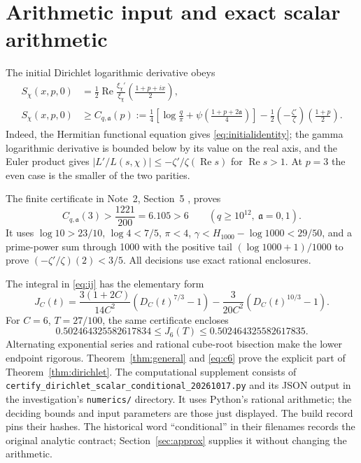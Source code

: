 \documentclass[11pt]{article}
\theoremstyle{remark}\newtheorem{remark}[theorem]{Remark}
\newcommand{\Rea}{\operatorname{Re}}
\begin{document}
\section{Arithmetic input and exact scalar arithmetic}
The initial Dirichlet logarithmic derivative obeys
\begin{align}
 S_\chi(x,p,0)&=\frac12\Rea\frac{\xi_\chi'}{\xi_\chi}
                    \left(\frac{1+p+ix}{2}\right),\label{eq:initialidentity}\\
 S_\chi(x,p,0)&\ge C_{q,\mathfrak a}(p):=
 \frac14\left[\log\frac q\pi+
 \psi\left(\frac{1+p+2\mathfrak a}{4}\right)\right]
 -\frac12\left(-\frac{\zeta'}\zeta\right)\left(\frac{1+p}{2}\right).
 \label{eq:c}
\end{align}
Indeed, the Hermitian functional equation gives
\eqref{eq:initialidentity}; the gamma logarithmic derivative is bounded
below by its value on the real axis, and the Euler product gives
$|L'/L(s,\chi)|\le-\zeta'/\zeta(\Rea s)$ for $\Rea s>1$.
At $p=3$ the even case is the smaller of the two parities.

The finite certificate in Note~2, Section~5 \cite{note2}, proves
\begin{equation}
 C_{q,\mathfrak a}(3)>\frac{1221}{200}=6.105>6
 \qquad(q\ge10^{12},\ \mathfrak a=0,1).\label{eq:c6}
\end{equation}
It uses $\log10>23/10$, $\log4<7/5$, $\pi<4$,
$\gamma<H_{1000}-\log1000<29/50$, and a prime-power sum through 1000
with the positive tail $(\log1000+1)/1000$ to prove
$(-\zeta'/\zeta)(2)<3/5$. All decisions use exact rational enclosures.

The integral in \eqref{eq:ij} has the elementary form
\begin{equation}
 J_C(t)=\frac{3(1+2C)}{14C^2}(D_C(t)^{7/3}-1)
       -\frac3{20C^2}(D_C(t)^{10/3}-1).\label{eq:exactj}
\end{equation}
For $C=6$, $T=27/100$, the same certificate encloses
\[0.502464325582617834\le J_6(T)\le0.502464325582617835.\]
Alternating exponential series and rational cube-root bisection make
the lower endpoint rigorous. Theorem~\ref{thm:general} and
\eqref{eq:c6} prove the explicit part of Theorem~\ref{thm:dirichlet}.
The computational supplement consists of
\texttt{certify\_dirichlet\_scalar\_conditional\_20261017.py} and its JSON
output in the investigation's \texttt{numerics/} directory. It uses
Python's rational arithmetic; the deciding bounds and input parameters
are those just displayed. The build record pins their hashes. The
historical word ``conditional'' in their filenames records the original
analytic contract; Section~\ref{sec:approx} supplies it without changing
the arithmetic.
\end{document}
